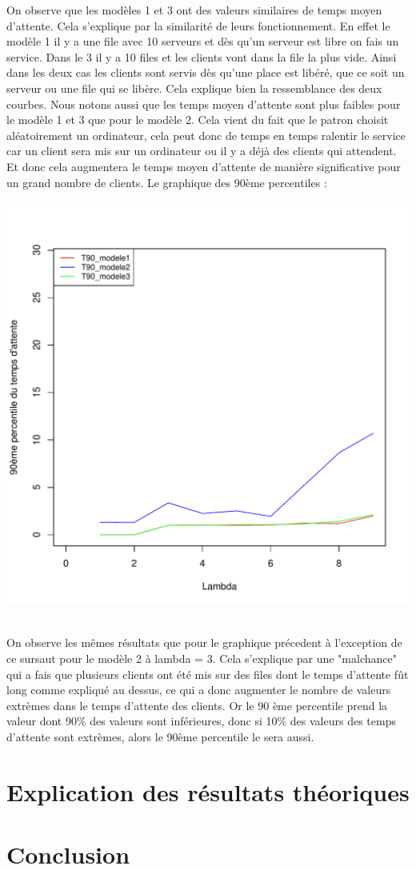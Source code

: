 \documentclass[a4paper,11pt]{article}
\begin{document}
	On observe que les modèles 1 et 3 ont des valeurs similaires de temps moyen d'attente. Cela s'explique par la similarité de leurs fonctionnement. En effet le modèle 1
	il y a une file avec 10 serveurs et dès qu'un serveur est libre on fais un service. Dans le 3 il y a 10 files et les clients vont dans la file la plus vide. Ainsi 
	dans les deux cas les clients sont servis dès qu'une place est libéré, que ce soit un serveur ou une file qui se libère. Cela explique bien la ressemblance des deux courbes. 
	Nous notons aussi que les temps moyen d'attente sont plus faibles pour le modèle 1 et 3 que pour le modèle 2. Cela vient du fait que le patron choisit aléatoirement un ordinateur, cela peut donc 
	de temps en temps ralentir le service car un client sera mis sur un ordinateur ou il y a déjà des clients qui attendent. Et donc cela augmentera le temps moyen d'attente de manière
	significative pour un grand nombre de clients.
	\newpage
	Le graphique des 90ème percentiles : \\
	\centerline{\includegraphics[scale=0.8]{t90.pdf}}\\
	
	On observe les mêmes résultats que pour le graphique précedent à l'exception de ce sursaut pour le modèle 2 à lambda = 3. 
	Cela s'explique par une "malchance" qui a fais que plusieurs clients ont été 
	mis sur des files dont le temps d'attente fût long comme expliqué au dessus, ce qui a donc augmenter le nombre de valeurs extrèmes dans le temps d'attente des clients. Or le 90 ème percentile
	prend la valeur dont 90\% des valeurs sont inférieures, donc si 10\% des valeurs des temps d'attente sont extrèmes, alors le 90ème percentile le sera aussi.

\section{Explication des résultats théoriques}
	
\section{Conclusion}
	
\end{document}
